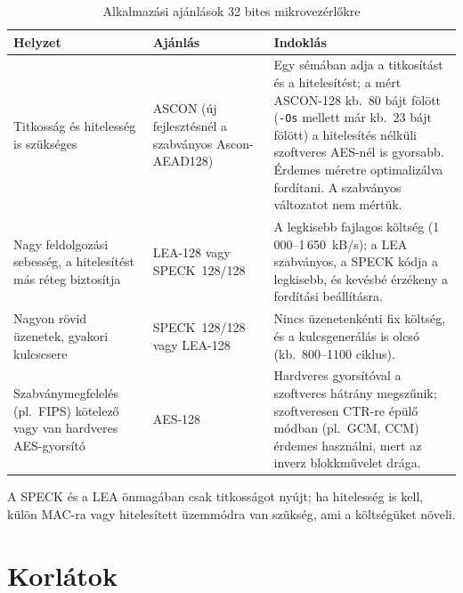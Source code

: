 \documentclass[a4paper,12pt]{report}
\theoremstyle{definition}
\theoremstyle{remark}
\begin{document}
\begin{table}[htbp]
    \centering
    \small
    \caption{Alkalmazási ajánlások 32 bites mikrovezérlőkre}
    \label{tab:ajanlasok}
    \begin{tabularx}{\textwidth}{|p{4.2cm}|p{3.0cm}|X|}
        \hline
        \textbf{Helyzet} & \textbf{Ajánlás} & \textbf{Indoklás} \\ \hline
        Titkosság és hitelesség is szükséges & ASCON (új fejlesztésnél a szabványos Ascon-AEAD128) & Egy sémában adja a titkosítást és a hitelesítést; a mért ASCON-128 kb.\ 80 bájt fölött (\texttt{-Os} mellett már kb.\ 23 bájt fölött) a hitelesítés nélküli szoftveres AES-nél is gyorsabb. Érdemes méretre optimalizálva fordítani. A szabványos változatot nem mértük. \\ \hline
        Nagy feldolgozási sebesség, a hitelesítést más réteg biztosítja & LEA-128 vagy SPECK~128/128 & A legkisebb fajlagos költség (1\,000--1\,650~kB/s); a LEA szabványos, a SPECK kódja a legkisebb, és kevésbé érzékeny a fordítási beállításra. \\ \hline
        Nagyon rövid üzenetek, gyakori kulcscsere & SPECK~128/128 vagy LEA-128 & Nincs üzenetenkénti fix költség, és a kulcsgenerálás is olcsó (kb.\ 800--1100 ciklus). \\ \hline
        Szabványmegfelelés (pl.\ FIPS) kötelező vagy van hardveres AES-gyorsító & AES-128 & Hardveres gyorsítóval a szoftveres hátrány megszűnik; szoftveresen CTR-re épülő módban (pl.\ GCM, CCM) érdemes használni, mert az inverz blokkművelet drága. \\ \hline
    \end{tabularx}
\end{table}

A SPECK és a LEA önmagában csak titkosságot nyújt; ha hitelesség is kell, külön MAC-ra vagy hitelesített üzemmódra van szükség, ami a költségüket növeli.

\section{Korlátok}
\end{document}
